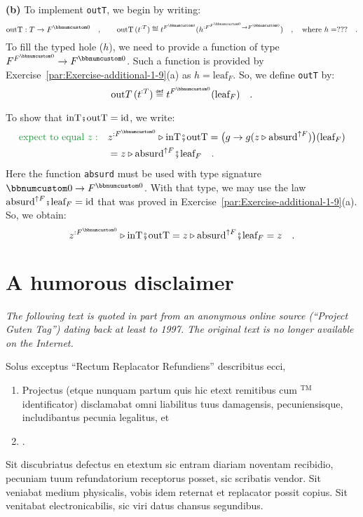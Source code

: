 \textbf{(b)} To implement \lstinline!outT!, we begin by writing:
\[
\text{outT}:T\rightarrow F^{\bbnum 0}\quad,\quad\quad\text{outT}\,(t^{:T})\triangleq t^{F^{\bbnum 0}}(h^{:F^{F^{\bbnum 0}}\rightarrow F^{\bbnum 0}})\quad,\quad\text{where }h=???\quad.
\]
To fill the typed hole ($h$), we need to provide a function of type
$F^{F^{\bbnum 0}}\rightarrow F^{\bbnum 0}$. Such a function is provided
by Exercise~\ref{par:Exercise-additional-1-9}(a) as $h=\text{leaf}_{F}$.
So, we define \lstinline!outT! by:
\[
\text{out}T\,(t^{:T})\triangleq t^{F^{\bbnum 0}}(\text{leaf}_{F})\quad.
\]

To show that $\text{inT}\bef\text{outT}=\text{id}$, we write:
\begin{align*}
{\color{greenunder}\text{expect to equal }z:}\quad & z^{:F^{\bbnum 0}}\triangleright\text{inT}\bef\text{outT}=\big(g\rightarrow g(z\triangleright\text{absurd}^{\uparrow F})\big)(\text{leaf}_{F})\\
 & =z\triangleright\text{absurd}^{\uparrow F}\bef\text{leaf}_{F}\quad.
\end{align*}
Here the function \lstinline!absurd! must be used with type signature
$\bbnum 0\rightarrow F^{\bbnum 0}$. With that type, we may use the
law $\text{absurd}^{\uparrow F}\bef\text{leaf}_{F}=\text{id}$ that
was proved in Exercise~\ref{par:Exercise-additional-1-9}(a). So,
we obtain:
\[
z^{:F^{\bbnum 0}}\triangleright\text{inT}\bef\text{outT}=z\triangleright\text{absurd}^{\uparrow F}\bef\text{leaf}_{F}=z\quad.
\]


\chapter{A humorous disclaimer}

\emph{The following text is quoted in part from an anonymous
online source (\textsf{``}Project Guten Tag\textsf{''}) dating back at least to 1997.
The original text is no longer available on the Internet.}

\medskip{}


Solus exceptus \textsf{``}Rectum Replacator Refundiens\textsf{''} describitus ecci,
\begin{enumerate}
\item Projectus (etque nunquam partum quis hic etext remitibus cum $^{\text{TM}}$ identificator) disclamabat omni liabilitus
tuus damagensis, pecuniensisque, includibantus pecunia legalitus,
et 
\item {}. 
\end{enumerate}
Sit discubriatus defectus en etextum sic entram diariam noventam recibidio,
pecuniam tuum refundatorium receptorus posset, sic scribatis vendor.
Sit veniabat medium physicalis, vobis idem reternat et replacator
possit copius. Sit venitabat electronicabilis, sic viri datus chansus
segundibus. 

